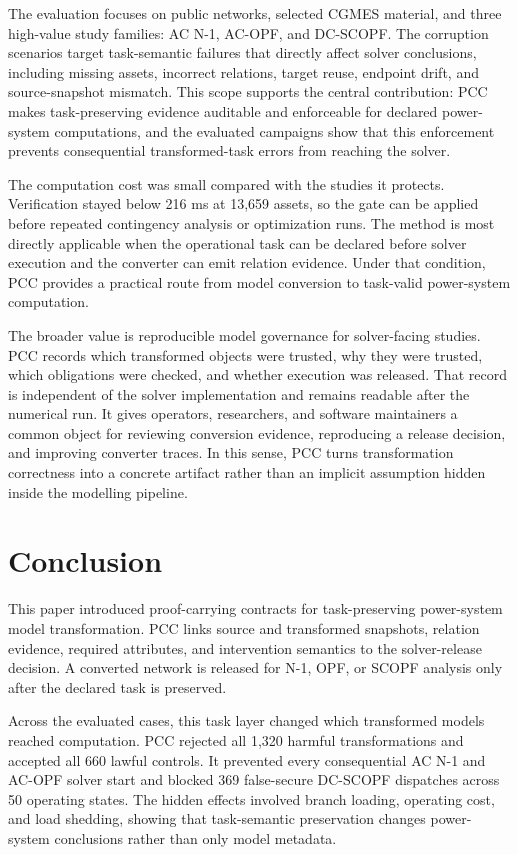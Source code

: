 \documentclass[preprint,12pt]{elsarticle}
\begin{document}
The evaluation focuses on public networks, selected CGMES material, and three high-value study families: AC N-1, AC-OPF, and DC-SCOPF. The corruption scenarios target task-semantic failures that directly affect solver conclusions, including missing assets, incorrect relations, target reuse, endpoint drift, and source-snapshot mismatch. This scope supports the central contribution: PCC makes task-preserving evidence auditable and enforceable for declared power-system computations, and the evaluated campaigns show that this enforcement prevents consequential transformed-task errors from reaching the solver.

The computation cost was small compared with the studies it protects. Verification stayed below 216 ms at 13,659 assets, so the gate can be applied before repeated contingency analysis or optimization runs. The method is most directly applicable when the operational task can be declared before solver execution and the converter can emit relation evidence. Under that condition, PCC provides a practical route from model conversion to task-valid power-system computation.

The broader value is reproducible model governance for solver-facing studies. PCC records which transformed objects were trusted, why they were trusted, which obligations were checked, and whether execution was released. That record is independent of the solver implementation and remains readable after the numerical run. It gives operators, researchers, and software maintainers a common object for reviewing conversion evidence, reproducing a release decision, and improving converter traces. In this sense, PCC turns transformation correctness into a concrete artifact rather than an implicit assumption hidden inside the modelling pipeline.

\section{Conclusion}
This paper introduced proof-carrying contracts for task-preserving power-system model transformation. PCC links source and transformed snapshots, relation evidence, required attributes, and intervention semantics to the solver-release decision. A converted network is released for N-1, OPF, or SCOPF analysis only after the declared task is preserved.

Across the evaluated cases, this task layer changed which transformed models reached computation. PCC rejected all 1,320 harmful transformations and accepted all 660 lawful controls. It prevented every consequential AC N-1 and AC-OPF solver start and blocked 369 false-secure DC-SCOPF dispatches across 50 operating states. The hidden effects involved branch loading, operating cost, and load shedding, showing that task-semantic preservation changes power-system conclusions rather than only model metadata.
\end{document}
